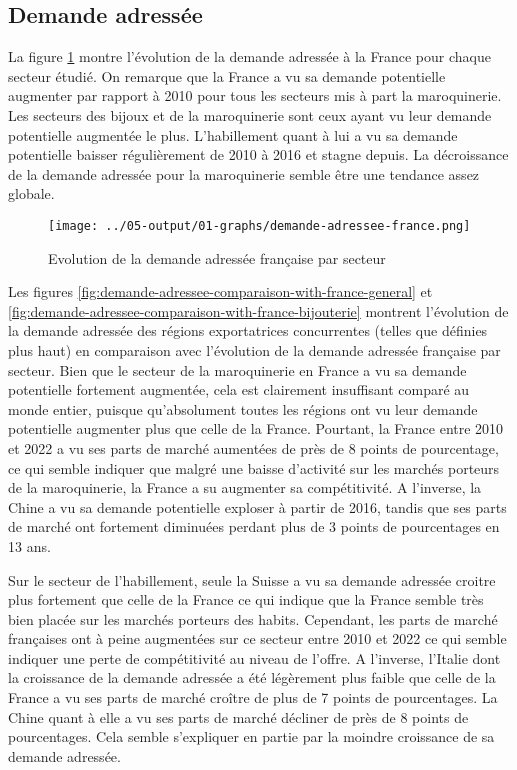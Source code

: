 \documentclass[french,10pt,a4paper]{article}
\begin{document}

\subsection{Demande adressée}

La figure \ref{fig:demande-adressee-france} montre l'évolution de la demande adressée à la France pour chaque secteur étudié. On remarque que la France a vu sa demande potentielle augmenter par rapport à 2010 pour tous les secteurs mis à part la maroquinerie. Les secteurs des bijoux et de la maroquinerie sont ceux ayant vu leur demande potentielle augmentée le plus. L'habillement quant à lui a vu sa demande potentielle baisser régulièrement de 2010 à 2016 et stagne depuis. La décroissance de la demande adressée pour la maroquinerie semble être une tendance assez globale.

\begin{figure}[!h]
  \centering
  \texttt{[image: ../05-output/01-graphs/demande-adressee-france.png]}
  \caption{Evolution de la demande adressée française par secteur}
  \label{fig:demande-adressee-france}
\end{figure}

Les figures \ref{fig:demande-adressee-comparaison-with-france-general} et \ref{fig:demande-adressee-comparaison-with-france-bijouterie} montrent l'évolution de la demande adressée des régions exportatrices concurrentes (telles que définies plus haut) en comparaison avec l'évolution de la demande adressée française par secteur. Bien que le secteur de la maroquinerie en France a vu sa demande potentielle fortement augmentée, cela est clairement insuffisant comparé au monde entier, puisque qu'absolument toutes les régions ont vu leur demande potentielle augmenter plus que celle de la France. Pourtant, la France entre 2010 et 2022 a vu ses parts de marché aumentées de près de 8 points de pourcentage, ce qui semble indiquer que malgré une baisse d'activité sur les marchés porteurs de la maroquinerie, la France a su augmenter sa compétitivité. A l'inverse, la Chine a vu sa demande potentielle exploser à partir de 2016, tandis que ses parts de marché ont fortement diminuées perdant plus de 3 points de pourcentages en 13 ans.

Sur le secteur de l'habillement, seule la Suisse a vu sa demande adressée croitre plus fortement que celle de la France ce qui indique que la France semble très bien placée sur les marchés porteurs des habits. Cependant, les parts de marché françaises ont à peine augmentées sur ce secteur entre 2010 et 2022 ce qui semble indiquer une perte de compétitivité au niveau de l'offre. A l'inverse, l'Italie dont la croissance de la demande adressée a été légèrement plus faible que celle de la France a vu ses parts de marché croître de plus de 7 points de pourcentages. La Chine quant à elle a vu ses parts de marché décliner de près de 8 points de pourcentages. Cela semble s'expliquer en partie par la moindre croissance de sa demande adressée.
\end{document}
